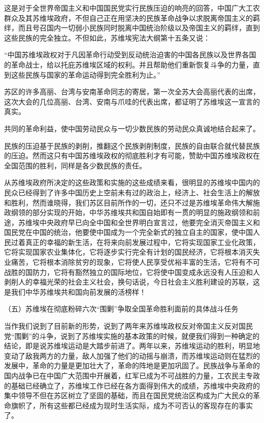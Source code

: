 这是对于全世界帝国主义和中国国民党实行民族压迫的响亮的回答，中国广大工农群众及其苏维埃政府，不但自己正在用坚决的民族革命战争以求脱离帝国主义的羁绊，而且号召国内一切弱小民族同时脱离中国统治阶级以及帝国主义的羁绊，直到这些民族的完全独立。不但如此，苏维埃宪法大纲第十五条又说：

“中国苏维埃政权对于凡因革命行动受到反动统治迫害的中国各民族以及世界各国的革命战士，给以托庇苏维埃区域的权利。并且帮助他们重新恢复斗争的力量，直到这些民族与国家的革命运动得到完全胜利为止。”

苏区的许多高丽、台湾与安南革命同志的寄居，第一次全苏大会高丽代表的出席，这次大会的几位高丽、台湾、安南与爪哇的代表出席，都证明了苏维埃这一宣言的真实。

共同的革命利益，使中国劳动民众与一切少数民族的劳动民众真诚地结合起来了。

民族的压迫基于民族的剥削，推翻这个民族剥削制度，民族的自由联合就代替民族的压迫。然而这只有中国苏维埃政权的彻底胜利才有可能，赞助中国苏维埃政权在全国范围的胜利，同样是各少数民族的责任。

从苏维埃政府所决定的这些政策和实施的这些成绩来看，很明显的苏维埃中国内的民众已经得到了许多中国历史上空前未有过的政治上，经济上、社会生活上的解放和胜利，然而谁晓得，我们苏区目前所作的一切，还只不过是苏维埃革命伟大解施政纲领的部分实现的开始，中华苏维埃共和国自始即有一贯的明显的施政纲领和前途，苏维埃中央政府早已向全中国和全世界明白宣言过，他要完全消灭帝国主义和国民党在中国的统治，他要使中国成为一个完全新式的独立自主的国家，使中国人民过着真正的幸福的新生活，在将来向前发展过程中，它将实现国家工业化政策，它将实现国家农业集体化，它将逐步实行完全有计划的国民经济，它将根本消灭失业痛苦，它将根本消除贫穷的现象，它将使人民享受优裕丰富的生活，它将有不可战胜的国防力，它将有豁然独立的国际地位，它将使中国变成永远没有人压迫和人剥削人的幸福光荣的社会主义社会，换句话说，今日社会主义胜利建设的苏联，这是我们中华苏维埃共和国向前发展的活榜样！

（五）苏维埃在彻底粉碎六次“围剿”争取全国革命胜利面前的具体战斗任务

当作我们说到了目前新的形势，说到了两年来苏维埃政权反对帝国主义反对国民党“围剿”的斗争，说到了苏维埃实施的基本政策的时候，就便我们得到一种确定的结论，即是说苏维埃运动是大踏步前进了。两年以来，苏维埃运动的胜利，明显地变动了敌我两方的力量，敌人加强了他们的动摇与崩溃，而苏维埃运动则在猛烈的发展中，革命的力量是更加壮大了，革命的阵地是更加巩固了。民族战争与革命的国内战争已在中国广大范围中开展着，红军已成为不可战胜的力量，工农民主专政的基础已经确立了，苏维埃工作已经在各方面得到伟大的成绩，苏维埃中央政府的集中领导不但在苏区树立了坚固的基础，而且在国民党统治区构成为广大民众的革命旗帜了，所有这些都已经成为现时生活实际，成为不可否认的客现存在的事实了。

